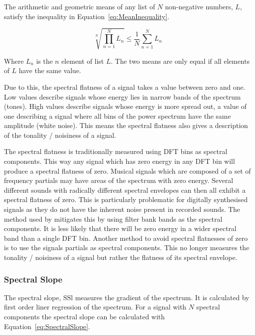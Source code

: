 			The arithmetic and geometric means of any list of $N$ non-negative numbers, $L$, satisfy the
			inequality in Equation~\ref{eq:MeanInequality}.

			\begin{equation}
				\sqrt[N]{\prod_{n = 1}^{N} L_{n}} \leq \frac{1}{N} \sum_{n = 1}^{N} L_{n}
				\label{eq:MeanInequality}
			\end{equation}

			Where $L_{n}$ is the $n$ element of list $L$. The two means are only equal if all
			elements of $L$ have the same value.

			Due to this, the spectral flatness of a signal takes a value between zero and one. Low values
			describe signals whose energy lies in narrow bands of the spectrum (tones). High values describe
			signals whose energy is more spread out, a value of one describing a signal where all bins of the
			power spectrum have the same amplitude (white noise). This means the spectral flatness also gives a
			description of the tonality / noisiness of a signal.

			The spectral flatness is traditionally measured using DFT bins as spectral components. This way any
			signal which has zero energy in any DFT bin will produce a spectral flatness of zero. Musical
			signals which are composed of a set of frequency partials may have areas of the spectrum with zero
			energy. Several different sounds with radically different spectral envelopes can then all exhibit a
			spectral flatness of zero. This is particularly problematic for digitally synthesised signals as
			they do not have the inherent noise present in recorded sounds. The method used by
			\citet{peeters2004a} mitigates this by using filter bank bands as the spectral components. It is
			less likely that there will be zero energy in a wider spectral band than a single DFT bin. Another
			method to avoid spectral flatnesses of zero is to use the signals partials as spectral components.
			This no longer measures the tonality / noisiness of a signal but rather the flatness of its
			spectral envelope.

		\subsubsection*{Spectral Slope}
			The spectral slope, $\mathrm{SSl}$ measures the gradient of the spectrum. It is calculated by first
			order liner regression of the spectrum. For a signal with $N$ spectral components the spectral
			slope can be calculated with Equation~\ref{eq:SpectralSlope}.

